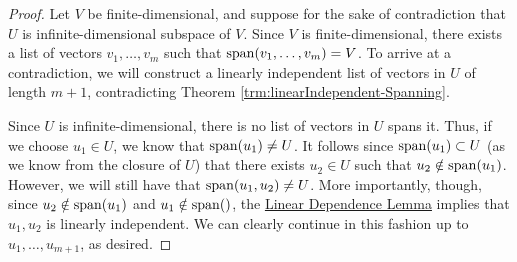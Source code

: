 \documentclass[../main.tex]{subfiles}
\begin{document}
\begin{itemize}
\begin{theorem}
        \begin{proof}
            Let $V$ be finite-dimensional, and suppose for the sake of contradiction that $U$ is infinite-dimensional subspace of $V$. Since $V$ is finite-dimensional, there exists a list of vectors $v_1,\dots,v_m$ such that $\operatorname{span}(v_1,\dots,v_m)=V$. To arrive at a contradiction, we will construct a linearly independent list of vectors in $U$ of length $m+1$, contradicting Theorem \ref{trm:linearIndependent-Spanning}.\par
            Since $U$ is infinite-dimensional, there is no list of vectors in $U$ spans it. Thus, if we choose $u_1\in U$, we know that $\operatorname{span}(u_1)\neq U$. It follows since $\operatorname{span}(u_1)\subset U$ (as we know from the closure of $U$) that there exists $u_2\in U$ such that $u_2\notin\operatorname{span}(u_1)$. However, we will still have that $\operatorname{span}(u_1,u_2)\neq U$. More importantly, though, since $u_2\notin\operatorname{span}(u_1)$ and $u_1\notin\operatorname{span}()$, the \hyperref[lem:linearDependenceLemma]{Linear Dependence Lemma} implies that $u_1,u_2$ is linearly independent. We can clearly continue in this fashion up to $u_1,\dots,u_{m+1}$, as desired.
        \end{proof}
    \end{theorem}
\end{itemize}
\end{document}
